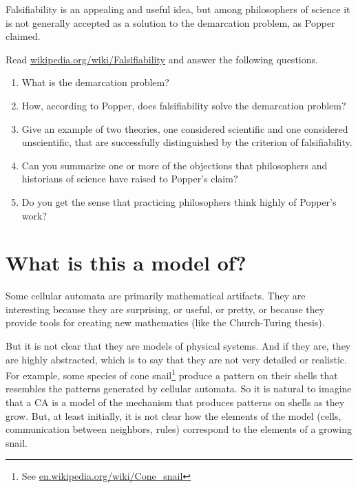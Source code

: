 \documentclass[10pt]{book}
\begin{document}
\begin{ex}

Falsifiability is an appealing and useful idea, but among
philosophers of science it is not generally accepted 
as a solution to the demarcation problem, as Popper claimed.

Read \url{wikipedia.org/wiki/Falsifiability} and answer the following questions.

\begin{enumerate}

\item What is the demarcation problem?

\item How, according to Popper, does falsifiability solve the
demarcation problem?

\item Give an example of two theories, one considered scientific
and one considered unscientific, that are successfully distinguished
by the criterion of falsifiability.

\item Can you summarize one or more of the objections that 
philosophers and historians of science have raised to Popper's
claim?

\item Do you get the sense that practicing philosophers think
highly of Popper's work?

\end{enumerate}

\end{ex}



\section{What is this a model of?}

Some cellular automata are primarily mathematical artifacts.
They are interesting because they are surprising, 
or useful, or pretty, or because they provide tools for
creating new mathematics (like the Church-Turing thesis).

But it is not clear that they are models of physical systems.  And if
they are, they are highly abstracted, which is to say that they are
not very detailed or realistic.  For example, some species of cone
snail\footnote{See \url{en.wikipedia.org/wiki/Cone_snail}} produce a
pattern on their shells that resembles the patterns generated by
cellular automata.  So it is natural to imagine that a CA is a model
of the mechanism that produces patterns on shells as they grow.  But,
at least initially, it is not clear how the elements of the model
(cells, communication between neighbors, rules) correspond to the
elements of a growing snail.
\end{document}
